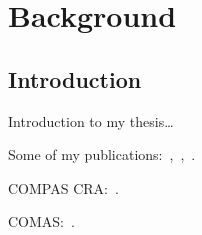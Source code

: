 \chapter{Background}\label{ch:background}


\section{Introduction}\label{sec:intro}

Introduction to my thesis\dots 

Some of my publications:~\cite{kao2022coupled},~\cite{kao2021understanding},~\cite{kao2017assembly}. 

COMPAS CRA:~\cite{compas-cra}. 

COMAS:~\cite{compas}. 


\cleardoublepage{}
\thispagestyle{empty}
